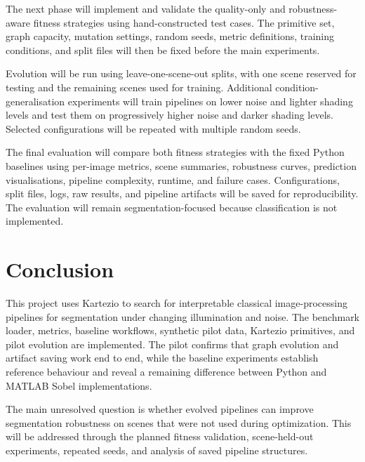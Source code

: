 \documentclass[11pt,a4paper]{article}
\begin{document}
The next phase will implement and validate the quality-only and robustness-aware fitness strategies using hand-constructed test cases. The primitive set, graph capacity, mutation settings, random seeds, metric definitions, training conditions, and split files will then be fixed before the main experiments.

Evolution will be run using leave-one-scene-out splits, with one scene reserved for testing and the remaining scenes used for training. Additional condition-generalisation experiments will train pipelines on lower noise and lighter shading levels and test them on progressively higher noise and darker shading levels. Selected configurations will be repeated with multiple random seeds.

The final evaluation will compare both fitness strategies with the fixed Python baselines using per-image metrics, scene summaries, robustness curves, prediction visualisations, pipeline complexity, runtime, and failure cases. Configurations, split files, logs, raw results, and pipeline artifacts will be saved for reproducibility. The evaluation will remain segmentation-focused because classification is not implemented.

\section{Conclusion}

This project uses Kartezio to search for interpretable classical image-processing pipelines for segmentation under changing illumination and noise. The benchmark loader, metrics, baseline workflows, synthetic pilot data, Kartezio primitives, and pilot evolution are implemented. The pilot confirms that graph evolution and artifact saving work end to end, while the baseline experiments establish reference behaviour and reveal a remaining difference between Python and MATLAB Sobel implementations.

The main unresolved question is whether evolved pipelines can improve segmentation robustness on scenes that were not used during optimization. This will be addressed through the planned fitness validation, scene-held-out experiments, repeated seeds, and analysis of saved pipeline structures.
\end{document}
